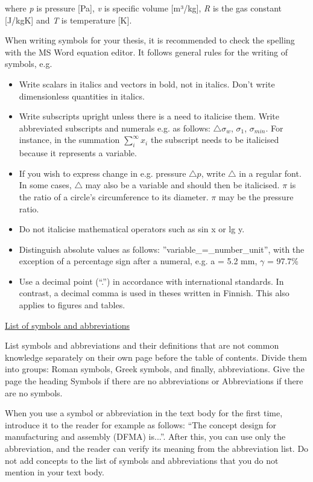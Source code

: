 where \textit{p} is pressure [Pa], \textit{v} is specific volume [m³/kg], \textit{R} is the gas constant [J/kgK] and \textit{T} is temperature [K].

When writing symbols for your thesis, it is recommended to check the spelling with the MS Word equation editor. It follows general rules for the writing of symbols, e.g. 

\begin{itemize}[noitemsep]
	\item Write scalars in italics and vectors in bold, not in italics. Don’t write dimensionless quantities in italics.
	\item Write subscripts upright unless there is a need to italicise them. Write abbreviated subscripts and numerals e.g. as follows: $\triangle\sigma_w$, $\sigma_1$, $\sigma_{min}$. For instance, in the summation $\sum_\textit{i}^\infty x_\textit{i}$ the subscript needs to be italicised because it represents a variable.
	\item If you wish to express change in e.g. pressure $\triangle p$, write $\triangle$ in a regular font. In some cases, $\triangle$ may also be a variable and should then be italicised. $\pi$ is the ratio of a circle’s circumference to its diameter. $\pi$ may be the pressure ratio.
	\item Do not italicise mathematical operators such as sin x or lg y.
	\item Distinguish absolute values as follows: ”variable\_=\_number\_unit”, with the exception of a percentage sign after a numeral, e.g. a = 5.2 mm, $\gamma$ = 97.7\%
	\item Use a decimal point (“.”) in accordance with international standards. In contrast, a decimal comma is used in theses written in Finnish. This also applies to figures and tables.
\end{itemize}

\underline{List of symbols and abbreviations}

List symbols and abbreviations and their definitions that are not common knowledge separately on their own page before the table of contents. Divide them into groups: Roman symbols, Greek symbols, and finally, abbreviations. Give the page the heading Symbols if there are no abbreviations or Abbreviations if there are no symbols.

When you use a symbol or abbreviation in the text body for the first time, introduce it to the reader for example as follows: “The concept design for manufacturing and assembly (DFMA) is...”. After this, you can use only the abbreviation, and the reader can verify its meaning from the abbreviation list. Do not add concepts to the list of symbols and abbreviations that you do not mention in your text body.